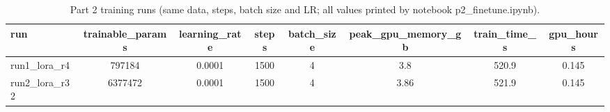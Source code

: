 \begin{table}[t]
\centering
\footnotesize
\caption{Part 2 training runs (same data, steps, batch size and LR; all values printed by notebook p2\_finetune.ipynb).}
\label{tab:p2train}
\begin{tabular}{lccccccc}
\hline
\textbf{run} & \textbf{trainable\_params} & \textbf{learning\_rate} & \textbf{steps} & \textbf{batch\_size} & \textbf{peak\_gpu\_memory\_gb} & \textbf{train\_time\_s} & \textbf{gpu\_hours} \\
\hline
run1\_lora\_r4 & 797184 & 0.0001 & 1500 & 4 & 3.8 & 520.9 & 0.145 \\
run2\_lora\_r32 & 6377472 & 0.0001 & 1500 & 4 & 3.86 & 521.9 & 0.145 \\
\hline
\end{tabular}
\end{table}